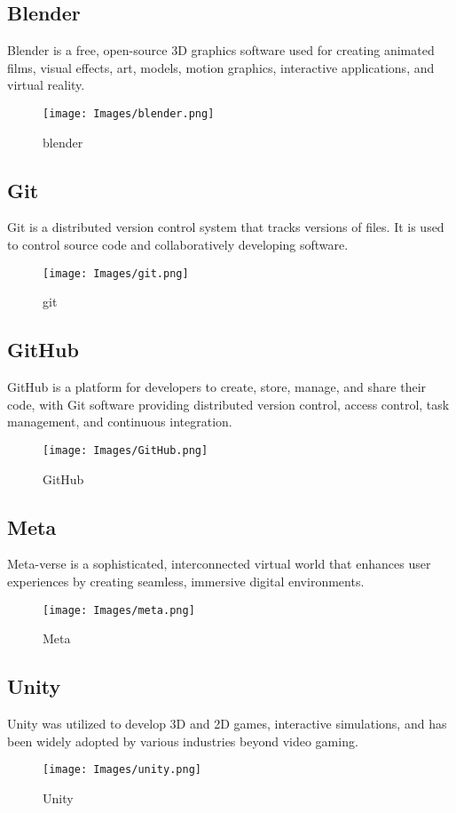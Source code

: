 \subsection{Blender}
Blender is a free, open-source 3D graphics software used for creating animated films, visual effects, art, models, motion graphics, interactive applications, and virtual reality.
\begin{figure}[h]
	\centering
	\texttt{[image: Images/blender.png]}
	\caption{blender\cite{blender}}
\end{figure}
\subsection{Git}
Git is a distributed version control system that tracks versions of files. It is used to control source code and collaboratively developing software.
\begin{figure}[h]
	\centering
	\texttt{[image: Images/git.png]}
	\caption{git\cite{git-logo}}
\end{figure}
\newpage
\subsection{GitHub}
GitHub is a platform for developers to create, store, manage, and share their code, with Git software providing distributed version control, access control, task management, and continuous integration.
\begin{figure}[h]
	\centering
	\texttt{[image: Images/GitHub.png]}
	\caption{GitHub\cite{github-logo}}
\end{figure}
\subsection{Meta}
Meta-verse is a sophisticated, interconnected virtual world that enhances user experiences by creating seamless, immersive digital environments.
\begin{figure}[h]
	\centering
	\texttt{[image: Images/meta.png]}
	\caption{Meta\cite{meta}}
\end{figure}
\subsection{Unity}
Unity was utilized to develop 3D and 2D games, interactive simulations, and has been widely adopted by various industries beyond video gaming.
\begin{figure}[h]
	\centering
	\texttt{[image: Images/unity.png]}
	\caption{Unity\cite{Unity}}
\end{figure}
\newpage
